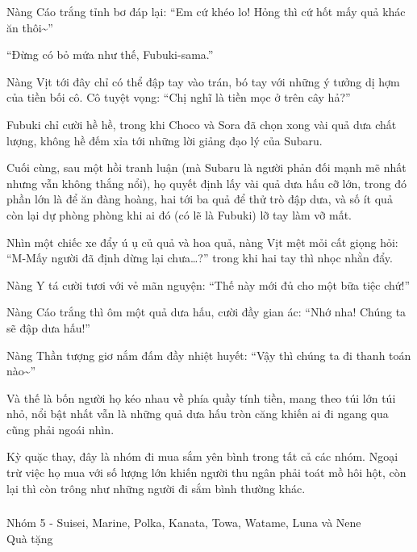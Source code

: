 \documentclass[../main.tex]{subfiles}
\begin{document}
Nàng Cáo trắng tỉnh bơ đáp lại: ``Em cứ khéo lo! Hỏng thì cứ hốt mấy quả khác ăn thôi\~{}''

``Đừng có bỏ mứa như thế, Fubuki-sama.''

Nàng Vịt tới đây chỉ có thể đập tay vào trán, bó tay với những ý tưởng dị hợm của tiền bối cô. Cô tuyệt vọng: ``Chị nghĩ là tiền mọc ở trên cây hả?''

Fubuki chỉ cười hề hề, trong khi Choco và Sora đã chọn xong vài quả dưa chất lượng, không hề đếm xỉa tới những lời giảng đạo lý của Subaru.

Cuối cùng, sau một hồi tranh luận (mà Subaru là người phản đối mạnh mẽ nhất nhưng vẫn không thắng nổi), họ quyết định lấy vài quả dưa hấu cỡ lớn, trong đó phần lớn là để ăn đàng hoàng, hai tới ba quả để thử trò đập dưa, và số ít quả còn lại dự phòng phòng khi ai đó (có lẽ là Fubuki) lỡ tay làm vỡ mất.

Nhìn một chiếc xe đẩy ú ụ củ quả và hoa quả, nàng Vịt mệt mỏi cất giọng hỏi: ``M-Mấy người đã định dừng lại chưa\dots?'' trong khi hai tay thì nhọc nhằn đẩy.

Nàng Y tá cười tươi với vẻ mãn nguyện: ``Thế này mới đủ cho một bữa tiệc chứ!''

Nàng Cáo trắng thì ôm một quả dưa hấu, cười đầy gian ác: ``Nhớ nha! Chúng ta sẽ đập dưa hấu!''

Nàng Thần tượng giơ nắm đấm đầy nhiệt huyết: ``Vậy thì chúng ta đi thanh toán nào\~{}''

Và thế là bốn người họ kéo nhau về phía quầy tính tiền, mang theo túi lớn túi nhỏ, nổi bật nhất vẫn là những quả dưa hấu tròn căng khiến ai đi ngang qua cũng phải ngoái nhìn.

Kỳ quặc thay, đây là nhóm đi mua sắm yên bình trong tất cả các nhóm. Ngoại trừ việc họ mua với số lượng lớn khiến người thu ngân phải toát mồ hôi hột, còn lại thì còn trông như những người đi sắm bình thường khác.

\vspace{-40pt}
\subsubsection*{\label{P1.1e}}

\begin{center}
    {\color{T5} Nhóm 5 - Suisei, Marine, Polka, Kanata, Towa, Watame, Luna và Nene\\Quà tặng}
\end{center}
\end{document}
